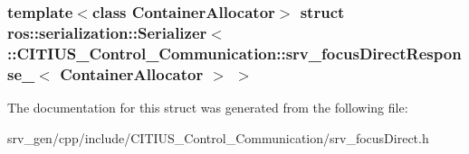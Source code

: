 \subsubsection*{template$<$class Container\-Allocator$>$ struct ros\-::serialization\-::\-Serializer$<$ \-::\-C\-I\-T\-I\-U\-S\-\_\-\-Control\-\_\-\-Communication\-::srv\-\_\-focus\-Direct\-Response\-\_\-$<$ Container\-Allocator $>$ $>$}



\-The documentation for this struct was generated from the following file\-:\begin{DoxyCompactItemize}
\item 
srv\-\_\-gen/cpp/include/\-C\-I\-T\-I\-U\-S\-\_\-\-Control\-\_\-\-Communication/srv\-\_\-focus\-Direct.\-h\end{DoxyCompactItemize}
